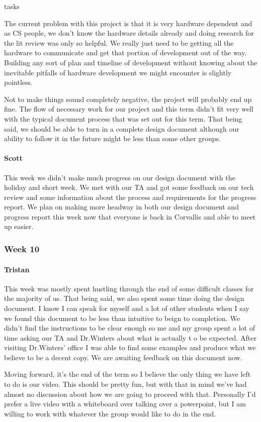 tasks\documentclass[onecolumn, draftclsnofoot,10pt, compsoc]{IEEEtran}
\begin{document}
The current problem with this project is that it is very hardware dependent and as CS people, we don't know the hardware details already and doing research for the lit review was only so helpful. We really just need to be getting all the hardware to communicate and get that portion of development out of the way. Building any sort of plan and timeline of development without knowing about the inevitable pitfalls of hardware development we might encounter is slightly pointless.

Not to make things sound completely negative, the project will probably end up fine. The flow of necessary work for our project and this term didn't fit very well with the typical document process that was set out for this term. That being said, we should be able to turn in a complete design document although our ability to follow it in the future might be less than some other groups.
\paragraph{Scott}
This week we didn't make much progress on our design document with the holiday and short week. We met with our TA and got some feedback on our tech review and some information about the process and requirements for the progress report. We plan on making more headway in both our design document and progress report this week now that everyone is back in Corvallis and able to meet up easier.
\subsubsection{Week 10}
\paragraph{Tristan}
This week was mostly spent hustling through the end of some difficult classes for the majority of us. That being said, we also spent some time doing the design document. I know I can speak for myself and a lot of other students when I say we found this document to be less than intuitive to beign to completion. We didn't find the instructions to be clear enough so me and my group spent a lot of time asking our TA and Dr.Winters about what is actually t o be expected. After visiting Dr.Winters' office I was able to find some examples and produce what we believe to be a decent copy. We are awaiting feedback on this document now.

Moving forward, it's the end of the term so I believe the only thing we have left to do is our video. This should be pretty fun, but with that in mind we've had almost no discussion about how we are going to proceed with that. Personally I'd prefer a live video with a whiteboard over talking over a powerpoint, but I am willing to work with whatever the group would like to do in the end.
\end{document}
